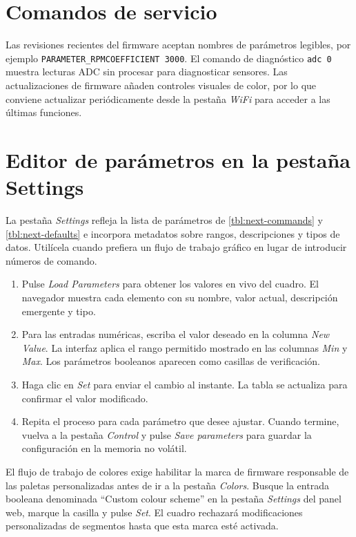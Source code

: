 \section{Comandos de servicio}
Las revisiones recientes del firmware aceptan nombres de parámetros legibles, por ejemplo \verb|PARAMETER_RPMCOEFFICIENT 3000|. El comando de diagnóstico \verb|adc 0| muestra lecturas ADC sin procesar para diagnosticar sensores. Las actualizaciones de firmware añaden controles visuales de color, por lo que conviene actualizar periódicamente desde la pestaña \emph{WiFi} para acceder a las últimas funciones.

\section{Editor de parámetros en la pestaña Settings}
La pestaña \emph{Settings} refleja la lista de parámetros de \autoref{tbl:next-commands} y \autoref{tbl:next-defaults} e incorpora metadatos sobre rangos, descripciones y tipos de datos.
Utilícela cuando prefiera un flujo de trabajo gráfico en lugar de introducir números de comando.

\begin{enumerate}
    \item Pulse \emph{Load Parameters} para obtener los valores en vivo del cuadro. El navegador muestra cada elemento con su nombre, valor actual, descripción emergente y tipo.
    \item Para las entradas numéricas, escriba el valor deseado en la columna \emph{New Value}. La interfaz aplica el rango permitido mostrado en las columnas \emph{Min} y \emph{Max}. Los parámetros booleanos aparecen como casillas de verificación.
    \item Haga clic en \emph{Set} para enviar el cambio al instante. La tabla se actualiza para confirmar el valor modificado.
    \item Repita el proceso para cada parámetro que desee ajustar. Cuando termine, vuelva a la pestaña \emph{Control} y pulse \emph{Save parameters} para guardar la configuración en la memoria no volátil.
\end{enumerate}

El flujo de trabajo de colores exige habilitar la marca de firmware responsable de las paletas personalizadas antes de ir a la pestaña \emph{Colors}.
Busque la entrada booleana denominada “Custom colour scheme” en la pestaña \emph{Settings} del panel web, marque la casilla y pulse \emph{Set}. El cuadro rechazará modificaciones personalizadas de segmentos hasta que esta marca esté activada.

